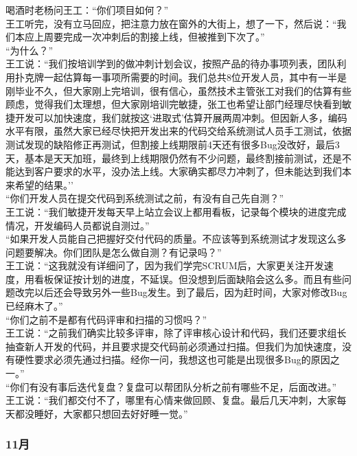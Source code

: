 喝酒时老杨问王工：``你们项目如何？''\\
王工听完，没有立马回应，把注意力放在窗外的大街上，想了一下，然后说：``我们本应上周要完成一次冲刺后的割接上线，但被推到下次了。''\\
``为什么？''\\
王工说：``我们按培训学到的做冲刺计划会议，按照产品的待办事项列表，团队利用扑克牌一起估算每一事项所需要的时间。我们总共8位开发人员，其中有一半是刚毕业不久，但大家刚上完培训，很有信心，虽然技术主管张工对我们的估算有些顾虑，觉得我们太理想，但大家刚培训完敏捷，张工也希望让部门经理尽快看到敏捷开发可以加快速度，我们就按这`进取式'估算开展两周冲刺。但因新人多，编码水平有限，虽然大家已经尽快把开发出来的代码交给系统测试人员手工测试，依据测试发现的缺陷修正再测试，但割接上线期限前4天还有很多Bug没改好，最后3天，基本是天天加班，最终到上线期限仍然有不少问题，最终割接前测试，还是不能达到客户要求的水平，没办法上线。大家确实都尽力冲刺了，但未能达到我们本来希望的结果。''\\
``你们开发人员在提交代码到系统测试之前，有没有自己先自测？''\\
王工说：``我们敏捷开发每天早上站立会议上都用看板，记录每个模块的进度完成情况，开发编码人员都说自测过。''\\
``如果开发人员能自己把握好交付代码的质量。不应该等到系统测试才发现这么多问题要解决。你们团队是怎么做自测？有记录吗？''\\
王工说：``这我就没有详细问了，因为我们学完SCRUM后，大家更关注开发速度，用看板保证按计划的进度，不延误。但没想到后面缺陷会这么多。而且有些问题改完以后还会导致另外一些Bug发生。到了最后，因为赶时间，大家对修改Bug已经麻木了。''\\
``你们之前不是都有代码评审和扫描的习惯吗？''\\
王工说：``之前我们确实比较多评审，除了评审核心设计和代码，我们还要求组长抽查新人开发的代码，并且要求提交代码前必须通过扫描。但我们为加快速度，没有硬性要求必须先通过扫描。经你一问，我想这也可能是出现很多Bug的原因之一。''\\
``你们有没有事后迭代复盘？复盘可以帮团队分析之前有哪些不足，后面改进。''\\
王工说：``我们都交付不了，哪里有心情来做回顾、复盘。最后几天冲刺，大家每天都没睡好，大家都只想回去好好睡一觉。''\\

\hypertarget{ux6708-4}{%
\subsubsection{11月}\label{ux6708-4}}

